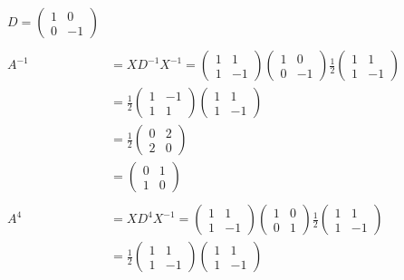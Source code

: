 \documentclass{article}
\begin{document}
\begin{align*}
    D = \begin{pmatrix} 1 & 0 \\ 0 & -1 \end{pmatrix} \\
    \\
    A^{-1} &= XD^{-1}X^{-1} = \begin{pmatrix} 1 & 1 \\ 1 & -1 \end{pmatrix} \begin{pmatrix} 1 & 0 \\ 0 & -1 \end{pmatrix} \frac{1}{2} \begin{pmatrix} 1 & 1 \\ 1 & -1 \end{pmatrix} \\
    &= \frac{1}{2} \begin{pmatrix} 1 & -1 \\ 1 & 1 \end{pmatrix} \begin{pmatrix} 1 & 1 \\ 1 & -1 \end{pmatrix} \\
    &= \frac{1}{2} \begin{pmatrix} 0 & 2 \\ 2 & 0 \end{pmatrix} \\
    &= \begin{pmatrix} 0 & 1 \\ 1 & 0 \end{pmatrix} \\
    \\
    A^4 &= XD^4X^{-1} = \begin{pmatrix} 1 & 1 \\ 1 & -1 \end{pmatrix} \begin{pmatrix} 1 & 0 \\ 0 & 1 \end{pmatrix} \frac{1}{2} \begin{pmatrix} 1 & 1 \\ 1 & -1 \end{pmatrix} \\
    &= \frac{1}{2} \begin{pmatrix} 1 & 1 \\ 1 & -1 \end{pmatrix} \begin{pmatrix} 1 & 1 \\ 1 & -1 \end{pmatrix} \\

\end{align*}
\end{document}
